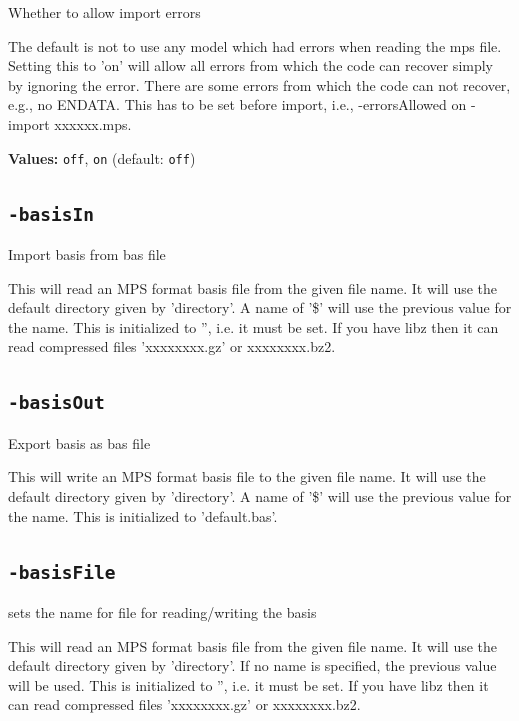 \documentclass[11pt,a4paper]{article}
\begin{document}
Whether to allow import errors

The default is not to use any model which had errors when reading the mps file.  Setting this to 'on' will allow all errors from which the code can recover simply by ignoring the error.  There are some errors from which the code can not recover, e.g., no ENDATA.  This has to be set before import, i.e., -errorsAllowed on -import xxxxxx.mps.

\textbf{Values:} \texttt{off}, \texttt{on} (default: \texttt{off})

\subsection*{\texttt{-basisIn}}

Import basis from bas file

This will read an MPS format basis file from the given file name.  It will use the default directory given by 'directory'.  A name of '\$' will use the previous value for the name. This is initialized to '', i.e. it must be set.  If you have libz then it can read compressed files 'xxxxxxxx.gz' or xxxxxxxx.bz2.

\subsection*{\texttt{-basisOut}}

Export basis as bas file

This will write an MPS format basis file to the given file name.  It will use the default directory given by 'directory'.  A name of '\$' will use the previous value for the name.  This is initialized to 'default.bas'.

\subsection*{\texttt{-basisFile}}

sets the name for file for reading/writing the basis

This will read an MPS format basis file from the given file name.  It will use the default directory given by 'directory'.  If no name is specified, the previous value will be used. This is initialized to '', i.e. it must be set.  If you have libz then it can read compressed files 'xxxxxxxx.gz' or xxxxxxxx.bz2.
\end{document}
